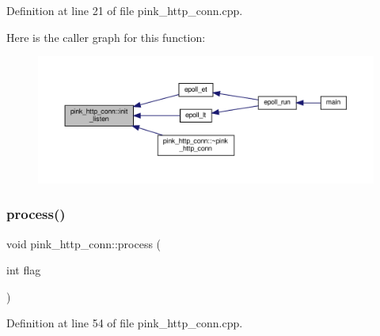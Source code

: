Definition at line 21 of file pink\+\_\+http\+\_\+conn.\+cpp.

Here is the caller graph for this function\+:\nopagebreak
\begin{figure}[H]
\begin{center}
\leavevmode
\includegraphics[width=350pt]{classpink__http__conn_a14ed30d2643f52ec95c45b11b13b2411_icgraph}
\end{center}
\end{figure}
\mbox{\label{classpink__http__conn_a41ca12d76d0056562633f27d456d0b62}} 
\subsubsection{\texorpdfstring{process()}{process()}}
{\footnotesize\ttfamily void pink\+\_\+http\+\_\+conn\+::process (\begin{DoxyParamCaption}\item[{int}]{flag }\end{DoxyParamCaption})}



Definition at line 54 of file pink\+\_\+http\+\_\+conn.\+cpp.

